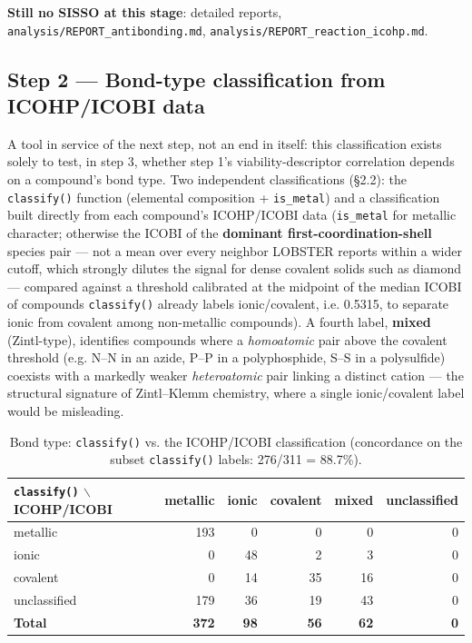 \documentclass[11pt,a4paper]{article}
\begin{document}
\textbf{Still no SISSO at this stage}: detailed reports,
\texttt{analysis/REPORT\_antibonding.md},
\texttt{analysis/REPORT\_reaction\_icohp.md}.

\subsection{Step 2 --- Bond-type classification from ICOHP/ICOBI data}
\label{sec:bondtype-classification}

A tool in service of the next step, not an end in itself: this
classification exists solely to test, in step 3, whether step 1's
viability-descriptor correlation depends on a compound's bond type. Two
independent classifications (\S2.2): the \texttt{classify()} function
(elemental composition + \texttt{is\_metal}) and a classification built
directly from each compound's ICOHP/ICOBI data (\texttt{is\_metal} for
metallic character; otherwise the ICOBI of the \textbf{dominant
first-coordination-shell} species pair --- not a mean over every
neighbor LOBSTER reports within a wider cutoff, which strongly dilutes
the signal for dense covalent solids such as diamond --- compared
against a threshold calibrated at the midpoint of the median ICOBI of
compounds \texttt{classify()} already labels ionic/covalent, i.e.
0.5315, to separate ionic from covalent among non-metallic compounds).
A fourth label, \textbf{mixed} (Zintl-type), identifies compounds where
a \emph{homoatomic} pair above the covalent threshold (e.g. N--N in an
azide, P--P in a polyphosphide, S--S in a polysulfide) coexists with a
markedly weaker \emph{heteroatomic} pair linking a distinct cation ---
the structural signature of Zintl--Klemm chemistry, where a single
ionic/covalent label would be misleading.

\begin{table}[htbp]
\centering
\caption{Bond type: \texttt{classify()} vs. the ICOHP/ICOBI classification (concordance on the subset \texttt{classify()} labels: 276/311 = 88.7\%).}
\label{tab:bondtype}
\begin{tabular}{@{}lrrrrr@{}}
\toprule
\texttt{classify()} $\backslash$ ICOHP/ICOBI & metallic & ionic & covalent & mixed & unclassified \\
\midrule
metallic       & 193 & 0  & 0  & 0 & 0 \\
ionic          & 0   & 48 & 2  & 3 & 0 \\
covalent       & 0   & 14 & 35 & 16 & 0 \\
unclassified   & 179 & 36 & 19 & 43 & 0 \\
\midrule
\textbf{Total} & \textbf{372} & \textbf{98} & \textbf{56} & \textbf{62} & \textbf{0} \\
\bottomrule
\end{tabular}
\end{table}
\end{document}
